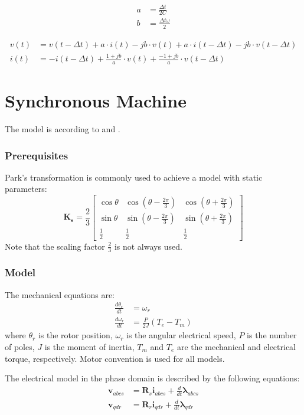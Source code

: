 \begin{align}
        a &= \frac{\Delta t}{2C} \\
        b &= \frac{\Delta t \omega}{2}
\end{align}

\begin{align}
        v(t) &= v(t - \Delta t) + a \cdot i(t) - j b \cdot v(t) + a \cdot i(t - \Delta t) - j b \cdot v(t - \Delta t) \\
        i(t) &= -i(t- \Delta t) + \frac{1+jb}{a} \cdot v(t) + \frac{-1+jb}{a} \cdot v(t - \Delta t)
\end{align}

\section{Synchronous Machine}

The model is according to \cite{wang2010methods} and \cite{kundur1994power}. 

\subsubsection{Prerequisites}
Park's transformation is commonly used to achieve a model with static parameters:
%
\begin{equation}
\mathbf{K_s} = \frac{2}{3}
 \begin{bmatrix} 
  \cos \theta & \cos(\theta-\frac{2\pi}{3}) & \cos(\theta+\frac{2\pi}{3}) \\
  \sin \theta & \sin(\theta-\frac{2\pi}{3}) & \sin(\theta+\frac{2\pi}{3}) \\
  \frac{1}{2} & \frac{1}{2} & \frac{1}{2}
 \end{bmatrix}
\end{equation}
%
Note that the scaling factor $\frac{2}{3}$ is not always used. 

\subsubsection{Model}

The mechanical equations are:
%
\begin{align}
\frac{d\theta_r}{dt} &= \omega_r \\
\frac{d\omega_r}{dt} &= \frac{P}{2J} (T_e-T_m)
\end{align}
%
where $\theta_r$ is the rotor position, $\omega_r$ is the angular electrical speed, $P$ is the number of poles, $J$ is the moment of inertia, $T_m$ and $T_e$ are the mechanical and electrical torque, respectively. Motor convention is used for all models. 

The electrical model in the phase domain is described by the following equations:
%
\begin{align}
  \mathbf{v}_{abcs} &= \mathbf{R}_s \mathbf{i}_{abcs} + \frac{d}{dt} \boldsymbol{\lambda}_{abcs} \\
  \mathbf{v}_{qdr} &= \mathbf{R}_r \mathbf{i}_{qdr} + \frac{d}{dt}  \boldsymbol{\lambda}_{qdr}
\end{align}
%